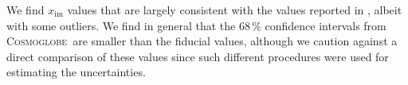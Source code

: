 \documentclass[twocolumn]{../../common/aa}
\def\WMAP{\emph{WMAP}}
\newcommand{\cosmoglobe}{\textsc{Cosmoglobe}}
\begin{document}
We find $x_\mathrm{im}$ values that are largely consistent with the values reported in \citet{bennett2012}, albeit with some outliers. We find in general that the 68\,\% confidence intervals from \cosmoglobe\ are smaller than the fiducial values, although we caution against a direct comparison of these values since such different procedures were used for estimating the uncertainties.


\end{document}
